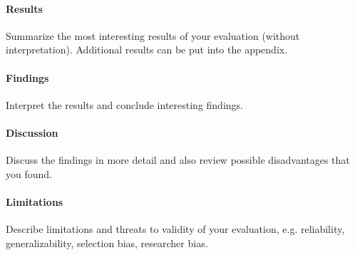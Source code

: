 	\paragraph{Results}
		Summarize the most interesting results of your evaluation (without interpretation).
		Additional results can be put into the appendix.
	\paragraph{Findings}
		Interpret the results and conclude interesting findings.
	\paragraph{Discussion}
		Discuss the findings in more detail and also review possible disadvantages that you found.
	\paragraph{Limitations}
		Describe limitations and threats to validity of your evaluation, e.g. reliability, generalizability, selection bias, researcher bias.

